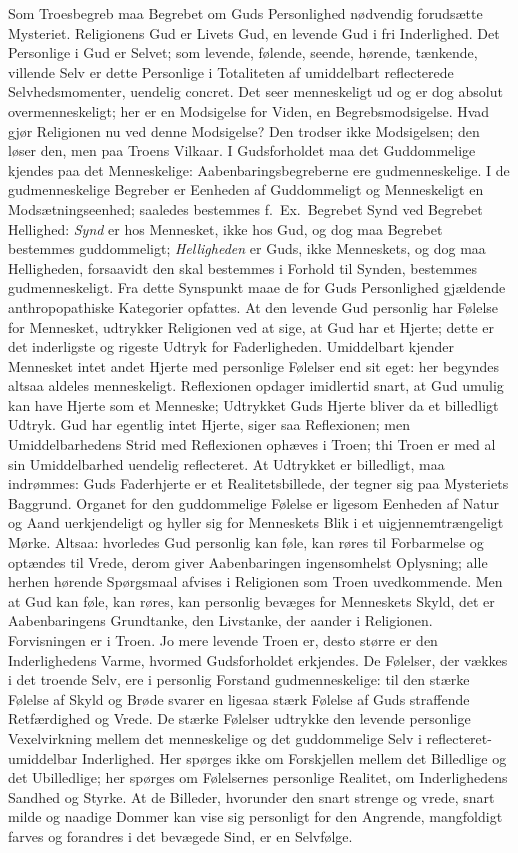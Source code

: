 \documentclass[12pt]{book}
\begin{document}
Som Troesbegreb maa Begrebet om Guds Personlighed nødvendig
forudsætte Mysteriet. Religionens Gud er Livets Gud, en levende Gud
i fri Inderlighed. Det Personlige i Gud er Selvet; som levende,
følende, seende, hørende, tænkende, villende Selv er dette
Personlige i Totaliteten af umiddelbart reflecterede
Selvhedsmomenter, uendelig concret. Det seer menneskeligt ud og er
dog absolut overmenneskeligt; her er en Modsigelse for Viden, en
Begrebsmodsigelse. Hvad gjør Religionen nu ved denne Modsigelse? Den
trodser ikke Modsigelsen;
den løser den, men paa Troens Vilkaar. I Gudsforholdet maa det
Guddommelige kjendes paa det Menneskelige:
Aabenbaringsbegreberne ere gudmenneskelige. I de gudmenneskelige
Begreber er Eenheden af Guddommeligt og Menneskeligt en
Modsætningseenhed; saaledes bestemmes f.\ Ex.\ Begrebet Synd ved
Begrebet Hellighed: \emph{Synd} er hos Mennesket, ikke hos Gud, og
dog maa Begrebet bestemmes guddommeligt; \emph{Helligheden} er
Guds, ikke Menneskets, og dog maa Helligheden, forsaavidt den skal
bestemmes i Forhold til Synden, bestemmes gudmenneskeligt. Fra dette
Synspunkt maae de for Guds Personlighed gjældende anthropopathiske
Kategorier opfattes. At den levende Gud personlig har Følelse for
Mennesket, udtrykker Religionen ved at sige, at Gud har et Hjerte;
dette er det inderligste og rigeste Udtryk for Faderligheden.
Umiddelbart kjender Mennesket intet andet Hjerte med personlige
Følelser end sit eget: her begyndes altsaa aldeles menneskeligt.
Reflexionen opdager imidlertid snart, at Gud umulig kan have Hjerte
som et Menneske; Udtrykket Guds Hjerte bliver da et billedligt
Udtryk. Gud har egentlig intet Hjerte, siger saa Reflexionen; men
Umiddelbarhedens Strid med Reflexionen ophæves i Troen; thi Troen er
med al sin Umiddelbarhed uendelig reflecteret. At Udtrykket er
billedligt, maa indrømmes: Guds Faderhjerte er et Realitetsbillede,
der tegner sig paa Mysteriets Baggrund. Organet for den
guddommelige Følelse er ligesom Eenheden af Natur og Aand
uerkjendeligt og hyller sig for Menneskets Blik i et
uigjennemtrængeligt Mørke. Altsaa: hvorledes Gud personlig kan føle,
kan røres til Forbarmelse og optændes til Vrede, derom giver
Aabenbaringen ingensomhelst Oplysning; alle herhen hørende
Spørgsmaal afvises i Religionen som Troen uvedkommende. Men at Gud
kan føle, kan røres, kan personlig bevæges for Menneskets Skyld, det
er Aabenbaringens Grundtanke, den Livstanke, der aander i
Religionen.
Forvisningen er i Troen. Jo mere levende Troen er, desto større er
den Inderlighedens Varme, hvormed Gudsforholdet erkjendes. De
Følelser, der vækkes i det troende Selv, ere i personlig Forstand
gudmenneskelige: til den stærke Følelse af Skyld og Brøde svarer en
ligesaa stærk Følelse af Guds straffende Retfærdighed og Vrede. De
stærke Følelser udtrykke den levende personlige Vexelvirkning mellem
det menneskelige og det guddommelige Selv i
reflecteret-umiddelbar Inderlighed. Her spørges ikke om Forskjellen
mellem det Billedlige og det Ubilledlige; her spørges om Følelsernes
personlige Realitet, om Inderlighedens Sandhed og Styrke. At de
Billeder, hvorunder den snart strenge og vrede, snart milde og
naadige Dommer kan vise sig personligt for den Angrende, mangfoldigt
farves og forandres i det bevægede Sind, er en Selvfølge.
\end{document}
